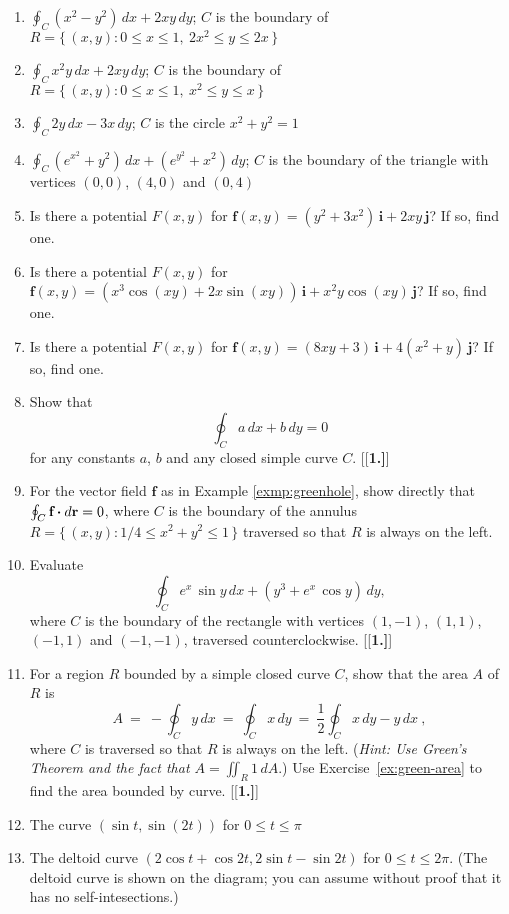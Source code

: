 \begin{enumerate}[\bfseries 1.]
 \item $\displaystyle\oint_C (x^2 - y^2 )\,dx + 2xy\,dy$; $C$ is the boundary
  of $R = \lbrace\,(x,y): 0 \le x \le 1,~2x^2 \le y \le 2x \,\rbrace$
 \item $\displaystyle\oint_C x^2 y\,dx + 2xy\,dy$; $C$ is the boundary
  of $R = \lbrace\,(x,y): 0 \le x \le 1,~x^2 \le y \le x \,\rbrace$
 \item $\displaystyle\oint_C 2y\,dx - 3x\,dy$; $C$ is the circle $x^2 + y^2 = 1$
 \item $\displaystyle\oint_C (e^{x^2} + y^2 )\,dx + (e^{y^2} + x^2 )\,dy$; $C$ is the boundary of the triangle with
  vertices $(0,0)$, $(4,0)$ and $(0,4)$
 \item Is there a potential $F(x,y)$ for $\mathbf{f}(x,y) = (y^2 + 3x^2 )\,\mathbf{i} + 2xy\,\mathbf{j}$?
  If so, find one.
 \item Is there a potential $F(x,y)$ for $\mathbf{f}(x,y) = (x^3 \cos (xy) + 2x \sin (xy))\,\mathbf{i} +
  x^2 y \cos (xy)\,\mathbf{j}$? If so, find one.
 \item Is there a potential $F(x,y)$ for $\mathbf{f}(x,y) = (8xy+3)\,\mathbf{i} +
  4(x^2 + y)\,\mathbf{j}$? If so, find one.
 \item Show that 
 \[\displaystyle\oint_C a\,dx + b\,dy = 0\]
 for any constants $a$, $b$ and any closed simple curve $C$.
[{[\bfseries 1.]}]
 \item For the vector field $\mathbf{f}$ as in Example \ref{exmp:greenhole}, show directly that
 $\oint_{C} \textbf{f} \bm{\cdot} d\textbf{r} = 0$, where
 $C$ is the boundary of the annulus $R =\lbrace\,(x,y): 1/4 \le x^2 + y^2 \le 1\,\rbrace$ traversed so that $R$ is
 always on the left.
 \item Evaluate \[\oint_C  e^x \,\sin y\,dx + (y^3 + e^x \,\cos y)\,dy,\] where $C$ is the boundary of the
  rectangle with vertices $(1,-1)$, $(1,1)$, $(-1,1)$ and $(-1,-1)$, traversed counterclockwise.
[{[\bfseries 1.]}]
 \item\label{ex:green-area} For a region $R$ bounded by a simple closed curve $C$, show that the area $A$ of $R$ is
  \begin{displaymath}
   A ~=~ -\oint_C y\,dx ~=~ \oint_C x\,dy ~=~ \frac{1}{2}\oint_C x\,dy - y\,dx ~,
  \end{displaymath}
  where $C$ is traversed so that $R$ is always on the left.
  (\emph{Hint: Use Green's Theorem and the fact that $A = \iint_{R} 1\,dA$}.)
Use Exercise~\ref{ex:green-area} to find the area bounded by curve.
[{[\bfseries 1.]}]

\item The curve $(\sin t,\sin(2 t))$ for $0\le t\le \pi$ 


\item The deltoid curve $(2\cos t+\cos 2t,2\sin t-\sin 2t)$ for $0\le t\le 2\pi$. 
(The deltoid curve is shown on the diagram; you can assume without proof that it has no self-intesections.)
\end{enumerate}

